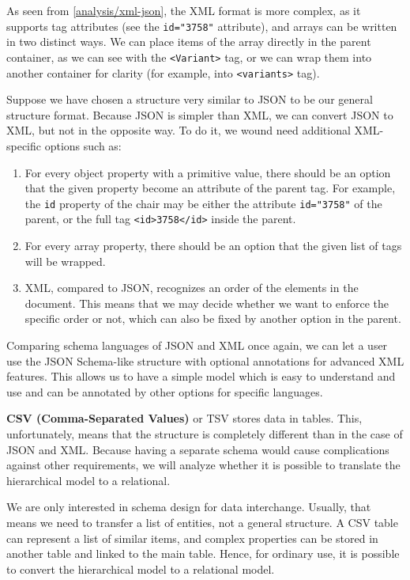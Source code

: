As seen from \autoref{analysis/xml-json}, the XML format is more complex, as it supports tag attributes (see the \verb|id="3758"| attribute), and arrays can be written in two distinct ways. We can place items of the array directly in the parent container, as we can see with the \verb|<Variant>| tag, or we can wrap them into another container for clarity (for example, into \verb|<variants>| tag).

Suppose we have chosen a structure very similar to JSON to be our general structure format. Because JSON is simpler than XML, we can convert JSON to XML, but not in the opposite way. To do it, we wound need additional XML-specific options such as:
\begin{enumerate}
  \item For every object property with a primitive value, there should be an option that the given property become an attribute of the parent tag. For example, the \verb|id| property of the chair may be either the attribute \verb|id="3758"| of the parent, or the full tag \verb|<id>3758</id>| inside the parent.
  \item For every array property, there should be an option that the given list of tags will be wrapped.
  \item XML, compared to JSON, recognizes an order of the elements in the document. This means that we may decide whether we want to enforce the specific order or not, which can also be fixed by another option in the parent.
\end{enumerate}

Comparing schema languages of JSON and XML once again, we can let a user use the JSON Schema-like structure with optional annotations for advanced XML features. This allows us to have a simple model which is easy to understand and use and can be annotated by other options for specific languages.

\textbf{CSV (Comma-Separated Values)} or TSV stores data in tables. This, unfortunately, means that the structure is completely different than in the case of JSON and XML. Because having a separate schema would cause complications against other requirements, we will analyze whether it is possible to translate the hierarchical model to a relational.

We are only interested in schema design for data interchange. Usually, that means we need to transfer a list of entities, not a general structure. A CSV table can represent a list of similar items, and complex properties can be stored in another table and linked to the main table. Hence, for ordinary use, it is possible to convert the hierarchical model to a relational model.

